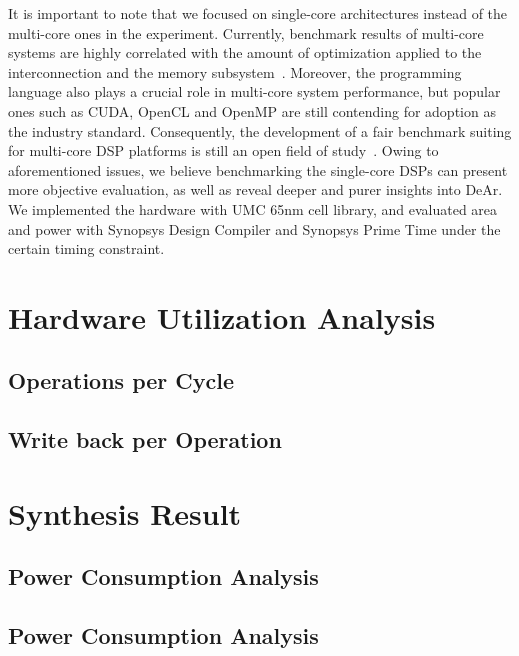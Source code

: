 It is important to note that we focused on single-core architectures instead of the multi-core ones in the experiment.
Currently, benchmark results of multi-core systems are highly correlated with the amount of optimization applied to the interconnection and the memory subsystem~\cite{trends}.
Moreover, the programming language also plays a crucial role in multi-core system performance, 
but popular ones such as CUDA, OpenCL and OpenMP are still contending for adoption as the industry standard.
Consequently, the development of a fair benchmark suiting for multi-core DSP platforms is still an open field of study~\cite{landscape}.
Owing to aforementioned issues, we believe benchmarking the single-core DSPs can present more objective evaluation, 
as well as reveal deeper and purer insights into DeAr.
We implemented the hardware with UMC 65nm cell library, 
and evaluated area and power with Synopsys Design Compiler and Synopsys Prime Time under the certain timing constraint.
\section{Hardware Utilization Analysis}
{
    \subsection{Operations per Cycle}
    \subsection{Write back per Operation}
}
\section{Synthesis Result}
{
    \subsection{Power Consumption Analysis}
    \subsection{Power Consumption Analysis}
}


